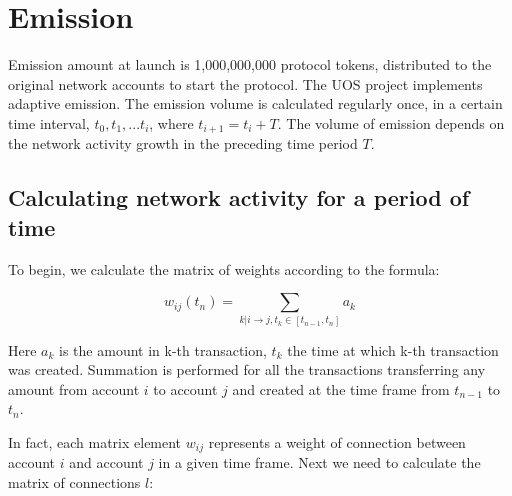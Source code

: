 \documentclass[a4paper,12pt]{article}
\begin{document}
\section{Emission}

Emission amount at launch is 1,000,000,000 protocol tokens, distributed to the original network accounts to start the protocol. The U{\degree}OS project implements adaptive emission. The emission volume is calculated regularly once, in a certain time interval, $t_0, t_1, ... t_i$, where $t_{i+1} = t_i + T$. The volume of emission depends on the network activity growth in the preceding time period $T$.


\subsection{Calculating network activity for a period of time}

To begin, we calculate the matrix of weights according to the formula:


$$
w_{ij}(t_n)=\sum_{k|i \to j, t_k \in [t_{n-1}, t_n]}a_k
$$

Here $a_k$  is the amount in k-th transaction, $t_k$  the time at which k-th transaction was created. Summation is performed for all the transactions transferring any amount from account $i$ to account $j$ and created at the time frame from $t_{n-1}$ to $t_n$. 

In fact, each matrix element $w_{ij}$ represents a weight of connection between account $i$ and account $j$ in a given time frame. Next we need to calculate the matrix of connections $l$: 

% 
% 
\end{document}
